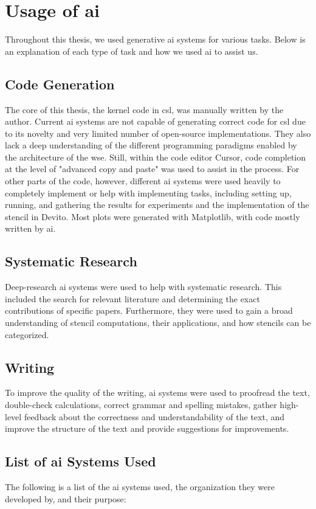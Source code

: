 \section{Usage of \ac{ai}}
Throughout this thesis, we used generative \ac{ai} systems for various tasks.
Below is an explanation of each type of task and how we used \ac{ai} to assist us.

\subsection{Code Generation}
The core of this thesis, the kernel code in \ac{csl}, was manually written by the author. Current \ac{ai} systems are not capable of generating correct code for \ac{csl} due to its novelty and very limited number of open-source implementations. They also lack a deep understanding of the different programming paradigms enabled by the architecture of the \ac{wse}. Still, within the code editor Cursor, code completion at the level of "advanced copy and paste" was used to assist in the process. For other parts of the code, however, different \ac{ai} systems were used heavily to completely implement or help with implementing tasks, including setting up, running, and gathering the results for experiments and the implementation of the stencil in Devito. Most plots were generated with Matplotlib, with code mostly written by \ac{ai}.

\subsection{Systematic Research}
Deep-research \ac{ai} systems were used to help with systematic research. This included the search for relevant literature and determining the exact contributions of specific papers. Furthermore, they were used to gain a broad understanding of stencil computations, their applications, and how stencils can be categorized.

\subsection{Writing}
To improve the quality of the writing, \ac{ai} systems were used to proofread the text, double-check calculations, correct grammar and spelling mistakes, gather high-level feedback about the correctness and understandability of the text, and improve the structure of the text and provide suggestions for improvements.

\subsection{List of \ac{ai} Systems Used}
The following is a list of the \ac{ai} systems used, the organization they were developed by, and their purpose:

